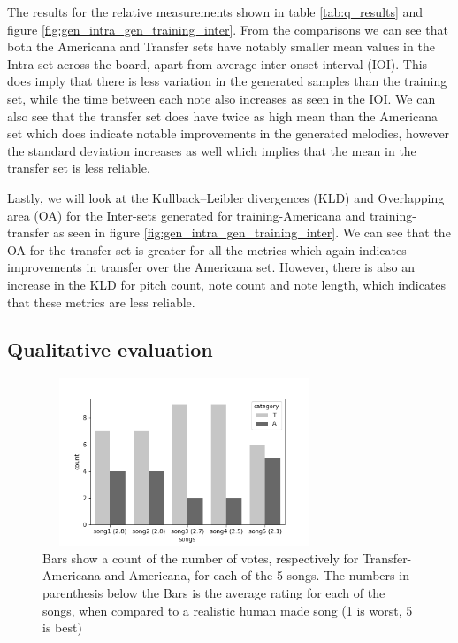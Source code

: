 \documentclass{IEEEtran}
\begin{document}
            The results for the relative measurements shown in table \ref{tab:q_results} and figure \ref{fig:gen_intra_gen_training_inter}. From the comparisons we can see that both the Americana and Transfer sets have notably smaller mean values in the Intra-set across the board, apart from average inter-onset-interval (IOI). This does imply that there is less variation in the generated samples than the training set, while the time between each note also increases as seen in the IOI. We can also see that the transfer set does have twice as high mean than the Americana set which does indicate notable improvements in the generated melodies, however the standard deviation increases as well which implies that the mean in the transfer set is less reliable.
            
            Lastly, we will look at the Kullback–Leibler divergences (KLD) and Overlapping area (OA) for the Inter-sets generated for training-Americana and training-transfer as seen in figure \ref{fig:gen_intra_gen_training_inter}. We can see that the OA for the transfer set is greater for all the metrics which again indicates improvements in transfer over the Americana set. However, there is also an increase in the KLD for pitch count, note count and note length, which indicates that these metrics are less reliable.
        

    \subsection{Qualitative evaluation}
    
        \begin{figure}[h]
            \centering
            \includegraphics[width=8.5cm, height=5cm]{songs_category.png}
            \caption{Bars show a count of the number of votes, respectively for Transfer-Americana
             and Americana, for each of the 5 songs. The numbers in parenthesis below the Bars
             is the average rating for each of the songs, when compared to a realistic human made
             song (1 is worst, 5 is best)}
             \label{fig:songs}
        \end{figure} 
\end{document}
